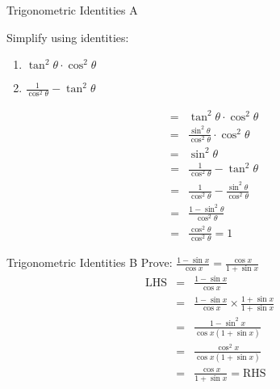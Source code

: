 \begin{wex}{Trigonometric Identities A}
{
Simplify using identities:
\begin{enumerate}
\item $\tan^2\theta \cdot \cos^2\theta$
\item $\frac{1}{\cos^2\theta} - \tan^2\theta$
\end{enumerate}
}
{
\begin{eqnarray*}
&=& \tan^2\theta \cdot \cos^2\theta \\
&=& \frac{\sin^2\theta}{\cos^2\theta}\cdot\cos^2\theta \\
&=& \sin^2\theta 
\end{eqnarray*}
\begin{eqnarray*}
&=&  \frac{1}{\cos^2\theta} - \tan^2\theta \\
&=& \frac{1}{\cos^2\theta} -\frac{\sin^2\theta}{\cos^2\theta} \\
&=& \frac{1-\sin^2\theta}{\cos^2\theta} \\
&=& \frac{\cos^2\theta}{\cos^2\theta} = 1 
\end{eqnarray*}
}
\end{wex}

\begin{wex}{Trigonometric Identities B}
{%
Prove: $\frac{1-\sin x}{\cos x} = \frac{\cos x}{1+\sin x}$
}%
{%
\begin{eqnarray*}
\mbox{LHS} &= & \frac{1-\sin x}{\cos x} \\
 &=& \frac{1-\sin x}{\cos x} \times  \frac{1+\sin x}{1+\sin x}\\
 &=& \frac{1-\sin^2x}{\cos x(1+\sin x)}\\
 &=& \frac{\cos^2x}{\cos x(1+\sin x)} \\
 &=& \frac{\cos x}{1+\sin x} = \mbox{RHS}
\end{eqnarray*}
}%
\end{wex}

